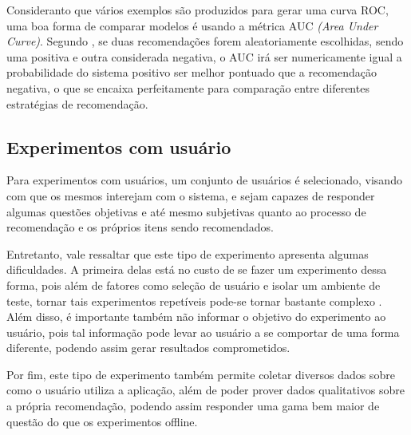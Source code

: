 Consideranto que vários exemplos são produzidos para gerar uma curva ROC, uma
boa forma de comparar modelos é usando a métrica AUC \textit{(Area Under
Curve)}. Segundo \cite{herlocker2004evaluating}, se duas recomendações forem
aleatoriamente escolhidas, sendo uma positiva e outra considerada negativa, o
AUC irá ser numericamente igual a probabilidade do sistema positivo ser melhor
pontuado que a recomendação negativa, o que se encaixa perfeitamente para
comparação entre diferentes estratégias de recomendação.

\subsection{Experimentos com usuário}

Para experimentos com usuários, um conjunto de usuários é selecionado, visando
com que os mesmos interejam com o sistema, e sejam capazes de responder algumas
questões objetivas e até mesmo subjetivas quanto ao processo de recomendação e
os próprios itens sendo recomendados.

Entretanto, vale ressaltar que este tipo de experimento apresenta algumas
dificuldades. A primeira delas está no custo de se fazer um experimento dessa
forma, pois além de fatores como seleção de usuário e isolar um ambiente de
teste, tornar tais experimentos repetíveis pode-se tornar bastante complexo
\cite{shani2011evaluating}. Além disso, é importante também não informar o
objetivo do experimento ao usuário, pois tal informação pode levar ao usuário a
se comportar de uma forma diferente, podendo assim gerar resultados
comprometidos.

Por fim, este tipo de experimento também permite coletar diversos dados sobre
como o usuário utiliza a aplicação, além de poder prover dados qualitativos
sobre a própria recomendação, podendo assim responder uma gama bem maior de
questão do que os experimentos offline.
